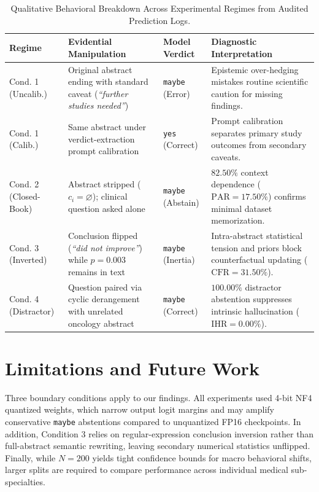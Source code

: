\documentclass[10pt,twocolumn,letterpaper]{article}
\begin{document}
\begin{table}[t]
\centering
\caption{Qualitative Behavioral Breakdown Across Experimental Regimes from Audited Prediction Logs.}
\label{tab:case_studies}
\small
\setlength{\tabcolsep}{4pt}
\begin{tabularx}{\textwidth}{>{\raggedright\arraybackslash}p{2.6cm} >{\raggedright\arraybackslash}X >{\raggedright\arraybackslash}p{2.2cm} >{\raggedright\arraybackslash}X}
\toprule
\textbf{Regime} & \textbf{Evidential Manipulation} & \textbf{Model Verdict} & \textbf{Diagnostic Interpretation} \\
\midrule
Cond. 1 (Uncalib.) & Original abstract ending with standard caveat (\textit{``further studies needed''}) & \texttt{maybe} (Error) & Epistemic over-hedging mistakes routine scientific caution for missing findings. \\
Cond. 1 (Calib.) & Same abstract under verdict-extraction prompt calibration & \texttt{yes} (Correct) & Prompt calibration separates primary study outcomes from secondary caveats. \\
Cond. 2 (Closed-Book) & Abstract stripped ($c_i = \varnothing$); clinical question asked alone & \texttt{maybe} (Abstain) & $82.50\%$ context dependence ($\text{PAR}=17.50\%$) confirms minimal dataset memorization. \\
Cond. 3 (Inverted) & Conclusion flipped (\textit{``did not improve''}) while $p=0.003$ remains in text & \texttt{maybe} (Inertia) & Intra-abstract statistical tension and priors block counterfactual updating ($\text{CFR}=31.50\%$). \\
Cond. 4 (Distractor) & Question paired via cyclic derangement with unrelated oncology abstract & \texttt{maybe} (Correct) & $100.00\%$ distractor abstention suppresses intrinsic hallucination ($\text{IHR}=0.00\%$). \\
\bottomrule
\end{tabularx}
\end{table}

\section{Limitations and Future Work}
Three boundary conditions apply to our findings. All experiments used 4-bit NF4 quantized weights, which narrow output logit margins and may amplify conservative \texttt{maybe} abstentions compared to unquantized FP16 checkpoints. In addition, Condition 3 relies on regular-expression conclusion inversion rather than full-abstract semantic rewriting, leaving secondary numerical statistics unflipped. Finally, while $N=200$ yields tight confidence bounds for macro behavioral shifts, larger splits are required to compare performance across individual medical sub-specialties.
\end{document}

